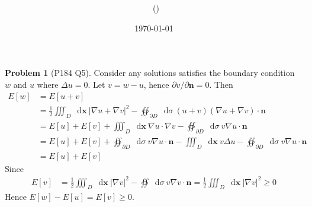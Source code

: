 \documentclass[twoside,11pt]{article}
\title{{\sffamily \Code \ \Ass}}
\author{\sffamily \name \ (\href{mailto:\mail}{\mail})}
\date{\sffamily \today}
\makeatletter
\renewcommand*\d{\mathop{}\!\mathrm{d}}
\theoremstyle{definition}
\newtheorem{problem}{Problem}
\theoremstyle{remark}
\newtheorem*{remark}{Remark}
\renewcommand{\maketitle}{\bgroup\setlength{\parindent}{0pt}
\begin{flushleft}
  \textbf{\Large\@title}

  \@author
\end{flushleft}\egroup
}
\makeatother
\begin{document}
\maketitle
\thispagestyle{title}


\begin{problem}[P184 Q5]
Consider any solutions satisfies the boundary condition
$w$ and $u$ where $\Delta u=0$.
Let $v=w-u$, hence $\partial v/\partial \mathbf{n} = 0$.
Then
\begin{align*}
    E[w] &= E[u+v] \\
    &= \frac{1}{2}\iiint_D\d\mathbf{x}\ 
    |\nabla u + \nabla v|^2 - \oiint_{\partial D}
    \d\sigma\ (u+v) (\nabla u + \nabla v)\cdot\mathbf{n}\\
    &= E[u] + E[v] + \iiint_D\d\mathbf{x}\ \nabla u\cdot\nabla v
    - \oiint_{\partial D}\d\sigma\ v\nabla u\cdot\mathbf{n}\\
    &= E[u] + E[v] + \oiint_{\partial D}\d\sigma\ v\nabla u\cdot\mathbf{n}
    - \iiint_D\d\mathbf{x}\ v\Delta u
    - \oiint_{\partial D}\d\sigma\ v\nabla u\cdot\mathbf{n}\\
    &= E[u] + E[v]
\end{align*}
Since
\begin{align*}
    E[v] &= \frac{1}{2}\iiint_D\d\mathbf{x}\ |\nabla v|^2
    - \oiint\d\sigma\ v\nabla v\cdot\mathbf{n}
    = \frac{1}{2}\iiint_D\d\mathbf{x}\ |\nabla v|^2
    \geq 0
\end{align*}
Hence $E[w]-E[u] = E[v]\geq 0$.
\end{problem}


\end{document}
